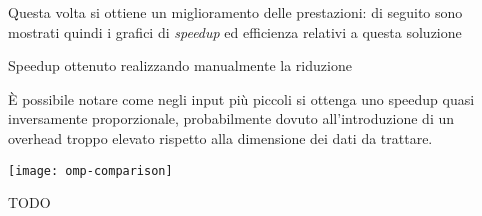 Questa volta si ottiene un miglioramento delle prestazioni: di seguito sono mostrati quindi i grafici di \emph{speedup} ed efficienza relativi a questa soluzione

\begin{plot}
    \caption{Speedup ottenuto realizzando manualmente la riduzione}
\end{plot}

È possibile notare come negli input più piccoli si ottenga uno speedup quasi inversamente proporzionale, probabilmente dovuto all'introduzione di un overhead troppo elevato rispetto alla dimensione dei dati da trattare.


\begin{plot}
    \texttt{[image: omp-comparison]}
    \caption{TODO}
    \label{fig:comparison}
\end{plot}
